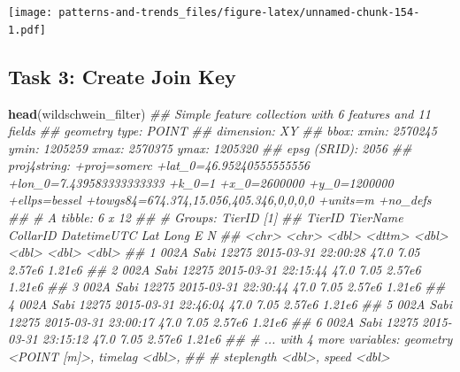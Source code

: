 \documentclass[]{book}
\newenvironment{Shaded}{\begin{snugshade}}{\end{snugshade}}
\newcommand{\CommentTok}[1]{\textcolor[rgb]{0.56,0.35,0.01}{\textit{#1}}}
\newcommand{\KeywordTok}[1]{\textcolor[rgb]{0.13,0.29,0.53}{\textbf{#1}}}
\newcommand{\NormalTok}[1]{#1}
\newcommand{\OperatorTok}[1]{\textcolor[rgb]{0.81,0.36,0.00}{\textbf{#1}}}
\newcommand{\StringTok}[1]{\textcolor[rgb]{0.31,0.60,0.02}{#1}}
\begin{document}
\texttt{[image: patterns-and-trends\_files/figure-latex/unnamed-chunk-154-1.pdf]}

\begin{Shaded}
\end{Shaded}

\hypertarget{task-3-create-join-key}{%
\subsection{Task 3: Create Join Key}\label{task-3-create-join-key}}

\begin{Shaded}
\begin{Highlighting}[]
\KeywordTok{head}\NormalTok{(wildschwein_filter)}
\CommentTok{## Simple feature collection with 6 features and 11 fields}
\CommentTok{## geometry type:  POINT}
\CommentTok{## dimension:      XY}
\CommentTok{## bbox:           xmin: 2570245 ymin: 1205259 xmax: 2570375 ymax: 1205320}
\CommentTok{## epsg (SRID):    2056}
\CommentTok{## proj4string:    +proj=somerc +lat_0=46.95240555555556 +lon_0=7.439583333333333 +k_0=1 +x_0=2600000 +y_0=1200000 +ellps=bessel +towgs84=674.374,15.056,405.346,0,0,0,0 +units=m +no_defs}
\CommentTok{## # A tibble: 6 x 12}
\CommentTok{## # Groups:   TierID [1]}
\CommentTok{##   TierID TierName CollarID DatetimeUTC           Lat  Long      E      N}
\CommentTok{##   <chr>  <chr>       <dbl> <dttm>              <dbl> <dbl>  <dbl>  <dbl>}
\CommentTok{## 1 002A   Sabi        12275 2015-03-31 22:00:28  47.0  7.05 2.57e6 1.21e6}
\CommentTok{## 2 002A   Sabi        12275 2015-03-31 22:15:44  47.0  7.05 2.57e6 1.21e6}
\CommentTok{## 3 002A   Sabi        12275 2015-03-31 22:30:44  47.0  7.05 2.57e6 1.21e6}
\CommentTok{## 4 002A   Sabi        12275 2015-03-31 22:46:04  47.0  7.05 2.57e6 1.21e6}
\CommentTok{## 5 002A   Sabi        12275 2015-03-31 23:00:17  47.0  7.05 2.57e6 1.21e6}
\CommentTok{## 6 002A   Sabi        12275 2015-03-31 23:15:12  47.0  7.05 2.57e6 1.21e6}
\CommentTok{## # ... with 4 more variables: geometry <POINT [m]>, timelag <dbl>,}
\CommentTok{## #   steplength <dbl>, speed <dbl>}
\end{Highlighting}
\end{Shaded}
\end{document}
